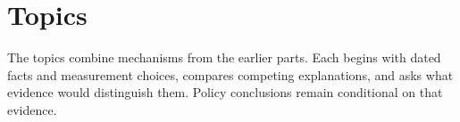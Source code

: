 \clearpage
\part{Topics}\label{part:topics}

The topics combine mechanisms from the earlier parts. Each begins with dated
facts and measurement choices, compares competing explanations, and asks what
evidence would distinguish them. Policy conclusions remain conditional on
that evidence.



